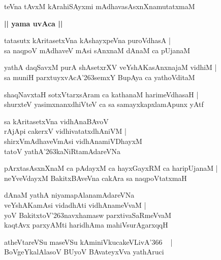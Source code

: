 \documentclass[twoside,12pt,openright]{book}
\def\S{\char'263}
\newcounter{shloka}[chapter]
\def\uvaca#1{\centerline{{\large\textbf{#1}}}}
\begin{document}
\begin{shloka}%
teVna tAvxM kArahiSAyxmi mAdhavasAsxnXnamutatxmaM 
\end{shloka}

\uvaca{|| yama uvAca ||}

\begin{shloka}%
tatasutx kAritasetxVna kAshayxpeVna puroVdhasA |\\
sa naqpoV mAdhaveV mAsi sAnxnaM dAnaM ca pUjanaM 
\end{shloka}

\begin{shloka}%
yathA daqSavxM purA shAsetxrXV veYshAKasAnxnajaM vidhiM |\\
sa muniH parxtuyxvAcA\S semxY BupAya ca yathoVditaM 
\end{shloka}

\begin{shloka}%
shaqNavxtaH sotxVtarxsAram ca kathanaM harimeVdhasaH |\\
shurxteV yasimxnanxdhiVteV ca sa samayxkapxlamApunx yAtf 
\end{shloka}

\begin{shloka}%
sa kAritasetxVna vidhAnaBAvoV \\
rAjApi cakerxV vidhivatatxdhAniVM |\\
shirxVmAdhaveVmAsi vidhAnamiVDhayxM \\
tatoV yathA\S kaNiRtamAdareVNa 
\end{shloka}

\begin{shloka}%
pArxtasAsxnXnaM ca pAdayxM ca hayxGayxRM ca haripUjanaM |\\
neYveVdayxM BakitxBAveVna cakAra sa naqpoVtatxmaH 
\end{shloka}

\begin{shloka}%
dAnaM yathA niyamapAlanamAdareVNa \\
veYshAKamAsi vidadhAti vidhAnameVvaM |\\
yoV BakitxtoV\S navxhamasw parxtivaSaRmeVvaM \\
kaqtAvx parxyAMti haridhAma mahiVsurAgarxqqH
\end{shloka}

\begin{shloka}%
atheVtareVSu maseVSu kAminiVkucakeVLivA\char'366 ~ |\\
BoVgeYkalAlasoV BUyoV BAvateyxVva yathAruci
\end{shloka}
\end{document}
